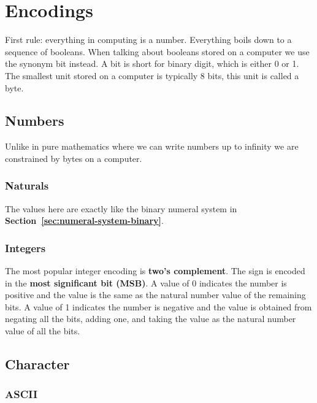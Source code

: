 \chapter{Encodings}

First rule: everything in computing is a number. Everything boils down to a
sequence of booleans. When talking about booleans stored on a computer we use
the synonym bit instead. A bit is short for binary digit, which is either 0 or
1. The smallest unit stored on a computer is typically 8 bits, this unit is
called a byte.

\section{Numbers}

Unlike in pure mathematics where we can write numbers up to infinity we are
constrained by bytes on a computer.

\subsection{Naturals}

The values here are exactly like the binary numeral system in
\textbf{Section~\ref{sec:numeral-system-binary}}.

\subsection{Integers}

The most popular integer encoding is \textbf{two's complement}. The sign is
encoded in the \textbf{most significant bit (MSB)}. A value of 0 indicates the
number is positive and the value is the same as the natural number value of the
remaining bits. A value of 1 indicates the number is negative and the value is
obtained from negating all the bits, adding one, and taking the value as the
natural number value of all the bits.

\newpage
\section{Character}

\subsection{ASCII}

